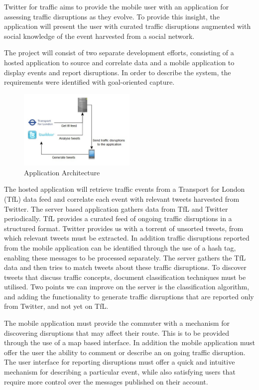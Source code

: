 Twitter for traffic aims to provide the mobile user with an application for assessing traffic disruptions as they evolve. To provide this insight, the application will present the user with curated traffic disruptions augmented with social knowledge of the event harvested from a social network.

The project will consist of two separate development efforts, consisting of a hosted application to source and correlate data and a mobile application to display events and report disruptions. In order to describe the system, the requirements were identified with goal-oriented capture\cite{Requirements}.

\begin{figure}[here]
\begin{center}
\includegraphics[width=0.5\textwidth]{images/draft_architecture.jpg}
\end{center}
\vspace{-20pt}
\caption{Application Architecture}
\end{figure}

The hosted application will retrieve traffic events from a Transport for London (TfL) data feed and correlate each event with relevant tweets harvested from Twitter. The server based application gathers data from TfL and Twitter periodically. TfL provides a curated feed of ongoing traffic disruptions in a structured format. Twitter provides us with a torrent of unsorted tweets, from which relevant tweets must be extracted. In addition traffic disruptions reported from the mobile application can be identified through the use of a hash tag, enabling these messages to be processed separately. The server gathers the TfL data and then tries to match tweets about these traffic disruptions. To discover tweets that discuss traffic concepts, document classification techniques must be utilised. Two points we can improve on the server is the classification algorithm, and adding the functionality to generate traffic disruptions that are reported only from Twitter, and not yet on TfL.

The mobile application must provide the commuter with a mechanism for discovering disruptions that may affect their route. This is to be provided through the use of a map based interface. In addition the mobile application must offer the user the ability to comment or describe an on going traffic disruption. The user interface for reporting disruptions must offer a quick and intuitive mechanism for describing a particular event, while also satisfying users that require more control over the messages published on their account.

